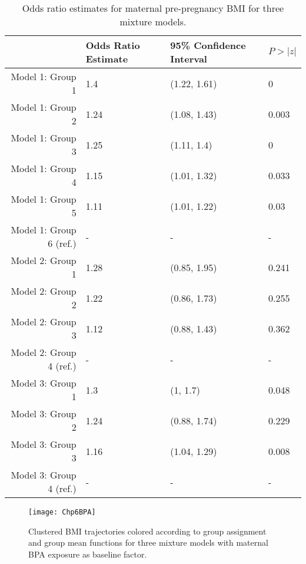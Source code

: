 \begin{table}[ht]
\begin{center}
\begin{tabular}{rlll}
  \hline
 & Odds Ratio Estimate & 95\% Confidence Interval & $P>|z|$ \\ 
  \hline
Model 1: Group  1 & 1.4 & (1.22, 1.61) & 0 \\ 
  Model 1: Group  2 & 1.24 & (1.08, 1.43) & 0.003 \\ 
  Model 1: Group  3 & 1.25 & (1.11, 1.4) & 0 \\ 
  Model 1: Group  4 & 1.15 & (1.01, 1.32) & 0.033 \\ 
  Model 1: Group  5 & 1.11 & (1.01, 1.22) & 0.03 \\ 
  Model 1: Group  6  (ref.) & - & - & - \\ 
  Model 2: Group  1 & 1.28 & (0.85, 1.95) & 0.241 \\ 
  Model 2: Group  2 & 1.22 & (0.86, 1.73) & 0.255 \\ 
  Model 2: Group  3 & 1.12 & (0.88, 1.43) & 0.362 \\ 
  Model 2: Group  4  (ref.) & - & - & - \\ 
  Model 3: Group  1 & 1.3 & (1, 1.7) & 0.048 \\ 
  Model 3: Group  2 & 1.24 & (0.88, 1.74) & 0.229 \\ 
  Model 3: Group  3 & 1.16 & (1.04, 1.29) & 0.008 \\ 
  Model 3: Group  4  (ref.) & - & - & - \\ 
   \hline
\end{tabular}
\caption{Odds ratio estimates for maternal pre-pregnancy BMI for three mixture models. }
\end{center}
\end{table}
\begin{figure}[h]
\begin{center}
\texttt{[image: Chp6BPA]}
\end{center}
\label{fig:dataresults}
\caption{Clustered BMI trajectories colored according to group assignment and group mean functions for three mixture models with maternal BPA exposure as baseline factor.}
\end{figure}
